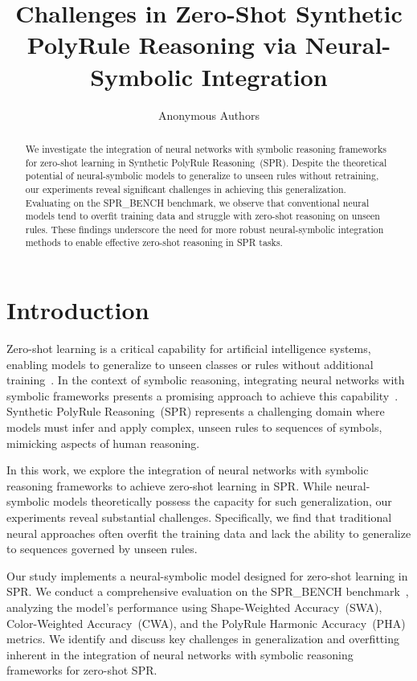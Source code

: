 \documentclass{article} %
\title{Challenges in Zero-Shot Synthetic PolyRule Reasoning via Neural-Symbolic Integration}
\author{Anonymous Authors}
\begin{document}
\maketitle

\begin{abstract}
We investigate the integration of neural networks with symbolic reasoning frameworks for zero-shot learning in Synthetic PolyRule Reasoning~(SPR). Despite the theoretical potential of neural-symbolic models to generalize to unseen rules without retraining, our experiments reveal significant challenges in achieving this generalization. Evaluating on the SPR\_BENCH benchmark, we observe that conventional neural models tend to overfit training data and struggle with zero-shot reasoning on unseen rules. These findings underscore the need for more robust neural-symbolic integration methods to enable effective zero-shot reasoning in SPR tasks.
\end{abstract}

\section{Introduction}
\label{sec:intro}

Zero-shot learning is a critical capability for artificial intelligence systems, enabling models to generalize to unseen classes or rules without additional training~\cite{pradhan2020unseenlc}. In the context of symbolic reasoning, integrating neural networks with symbolic frameworks presents a promising approach to achieve this capability~\cite{tsamoura2020neuralsymbolicia}. Synthetic PolyRule Reasoning~(SPR) represents a challenging domain where models must infer and apply complex, unseen rules to sequences of symbols, mimicking aspects of human reasoning.

In this work, we explore the integration of neural networks with symbolic reasoning frameworks to achieve zero-shot learning in SPR. While neural-symbolic models theoretically possess the capacity for such generalization, our experiments reveal substantial challenges. Specifically, we find that traditional neural approaches often overfit the training data and lack the ability to generalize to sequences governed by unseen rules.

Our study implements a neural-symbolic model designed for zero-shot learning in SPR. We conduct a comprehensive evaluation on the SPR\_BENCH benchmark~\cite{lorello2024thekb}, analyzing the model's performance using Shape-Weighted Accuracy~(SWA), Color-Weighted Accuracy~(CWA), and the PolyRule Harmonic Accuracy~(PHA) metrics. We identify and discuss key challenges in generalization and overfitting inherent in the integration of neural networks with symbolic reasoning frameworks for zero-shot SPR.
\end{document}
